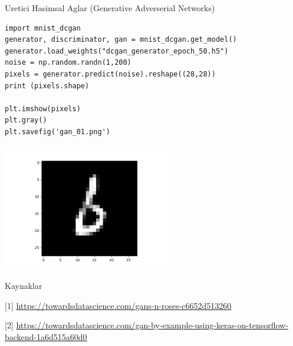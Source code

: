 \documentclass[12pt,fleqn]{article}\usepackage{../../common}
\begin{document}
Uretici Hasimsal Aglar (Generative Adverserial Networks)

\begin{verbatim}
import mnist_dcgan
generator, discriminator, gan = mnist_dcgan.get_model()
generator.load_weights("dcgan_generator_epoch_50.h5")
noise = np.random.randn(1,200)
pixels = generator.predict(noise).reshape((28,28))
print (pixels.shape)

plt.imshow(pixels)
plt.gray()
plt.savefig('gan_01.png')
\end{verbatim}

\includegraphics[width=20em]{gan_01.png}























Kaynaklar

[1] \url{https://towardsdatascience.com/gans-n-roses-c6652d513260}

[2] \url{https://towardsdatascience.com/gan-by-example-using-keras-on-tensorflow-backend-1a6d515a60d0}
\end{document}
